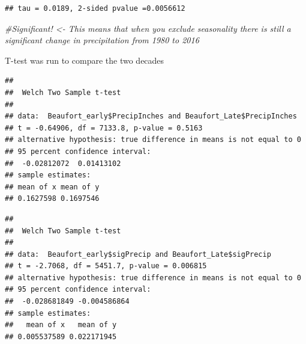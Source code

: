 \documentclass[
  12pt,
]{article}
\newenvironment{Shaded}{\begin{snugshade}}{\end{snugshade}}
\newcommand{\CommentTok}[1]{\textcolor[rgb]{0.56,0.35,0.01}{\textit{#1}}}
\newcommand{\FunctionTok}[1]{\textcolor[rgb]{0.00,0.00,0.00}{#1}}
\newcommand{\NormalTok}[1]{#1}
\newcommand{\SpecialCharTok}[1]{\textcolor[rgb]{0.00,0.00,0.00}{#1}}
\begin{document}
\begin{verbatim}
## tau = 0.0189, 2-sided pvalue =0.0056612
\end{verbatim}

\begin{Shaded}
\begin{Highlighting}[]
\CommentTok{\#Significant! \textless{}{-} This means that when you exclude seasonality there is still a significant change in precipitation from 1980 to 2016}
\end{Highlighting}
\end{Shaded}

T-test was run to compare the two decades

\begin{Shaded}
\end{Shaded}

\begin{verbatim}
## 
##  Welch Two Sample t-test
## 
## data:  Beaufort_early$PrecipInches and Beaufort_Late$PrecipInches
## t = -0.64906, df = 7133.8, p-value = 0.5163
## alternative hypothesis: true difference in means is not equal to 0
## 95 percent confidence interval:
##  -0.02812072  0.01413102
## sample estimates:
## mean of x mean of y 
## 0.1627598 0.1697546
\end{verbatim}

\begin{Shaded}
\end{Shaded}

\begin{verbatim}
## 
##  Welch Two Sample t-test
## 
## data:  Beaufort_early$sigPrecip and Beaufort_Late$sigPrecip
## t = -2.7068, df = 5451.7, p-value = 0.006815
## alternative hypothesis: true difference in means is not equal to 0
## 95 percent confidence interval:
##  -0.028681849 -0.004586864
## sample estimates:
##   mean of x   mean of y 
## 0.005537589 0.022171945
\end{verbatim}
\end{document}
